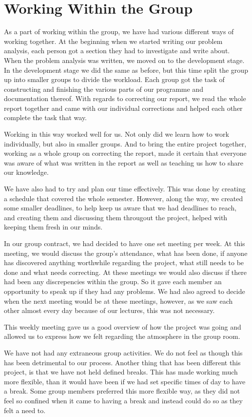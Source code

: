 \documentclass{article}
\begin{document}
\section{Working Within the Group}
As a part of working within the group, we have had various different ways of working together. 
At the beginning when we started writing our problem analysis, each person got a section they had to investigate and write about. 
When the problem analysis was written, we moved on to the development stage. 
In the development stage we did the same as before, but this time split the group up into smaller groups to divide the workload. 
Each group got the task of constructing and finishing the various parts of our programme and documentation thereof. 
With regards to correcting our report, we read the whole report together and came with our individual corrections and helped each other complete the task that way.

Working in this way worked well for us. Not only did we learn how to work individually, but also in smaller groups. 
And to bring the entire project together, working as a whole group on correcting the report, made it certain that everyone was aware of what was written in the report as well as teaching us how to share our knowledge.

We have also had to try and plan our time effectively. 
This was done by creating a schedule that covered the whole semester. 
However, along the way, we created some smaller deadlines, to help keep us aware that we had deadlines to reach, and creating them and discussing them througout the project, helped with keeping them fresh in our minds.

In our group contract, we had decided to have one set meeting per week. At this meeting, we would discuss the group's attendance, what has been done, if anyone has discovered anything worthwhile regarding the project, what still needs to be done and what needs correcting. 
At these meetings we would also discuss if there had been any discrepencies within the group. So it gave each member an opportunity to speak up if they had any problems.
We had also agreed to decide when the next meeting would be at these meetings, however, as we saw each other almost every day because of our lectures, this was not necessary.

This weekly meeting gave us a good overview of how the project was going and allowed us to express how we felt regarding the atmosphere in the group room. 

We have not had any extraneous group activities. 
We do not feel as though this has been detrimental to our process.
Another thing that has been different this project, is that we have not held defined breaks. 
This has made working much more flexible, than it would have been if we had set specific times of day to have a break. 
Some group members preferred this more flexible way, as they did not feel so confined when it came to having a break and instead could do so as they felt a need to.
\end{document}
